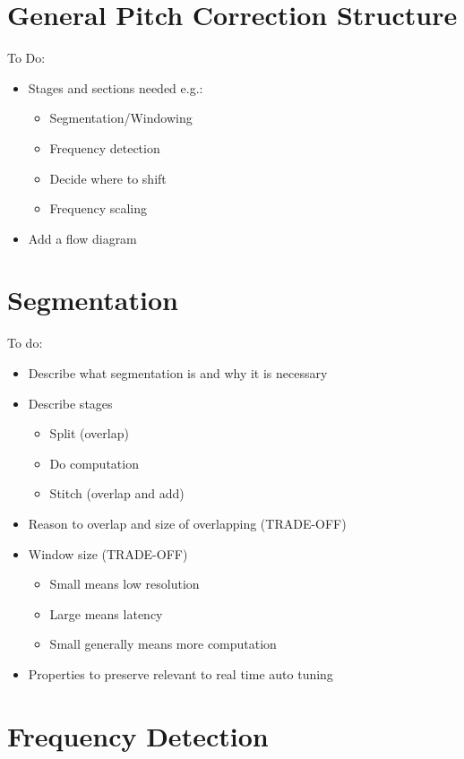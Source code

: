\section{General Pitch Correction Structure}

\color{red}
To Do:
\begin{itemize}
	\item Stages and sections needed e.g.:
	\begin{itemize}
		\item Segmentation/Windowing
		\item Frequency detection
		\item Decide where to shift
		\item Frequency scaling
	\end{itemize}
	\item Add a flow diagram
\end{itemize}
\color{black}

\section{Segmentation}

\color{red}
To do:
\begin{itemize}
	\item Describe what segmentation is and why it is necessary
	\item Describe stages
	\begin{itemize}
		\item Split (overlap)
		\item Do computation
		\item Stitch (overlap and add)
	\end{itemize}
	\item Reason to overlap and size of overlapping (TRADE-OFF)
	\item Window size (TRADE-OFF)
	\begin{itemize}
		\item Small means low resolution
		\item Large means latency
		\item Small generally means more computation
	\end{itemize}
	\item Properties to preserve relevant to real time auto tuning
\end{itemize}
\color{black}

\section{Frequency Detection}

